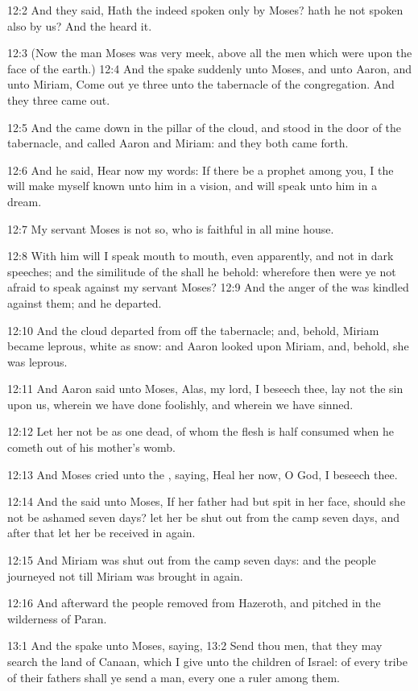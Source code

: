 12:2 And they said, Hath the \LORD indeed spoken only by Moses? hath he not spoken also by us? And the \LORD heard it.

12:3 (Now the man Moses was very meek, above all the men which were upon the face of the earth.)  12:4 And the \LORD spake suddenly unto Moses, and unto Aaron, and unto Miriam, Come out ye three unto the tabernacle of the congregation. And they three came out.

12:5 And the \LORD came down in the pillar of the cloud, and stood in the door of the tabernacle, and called Aaron and Miriam: and they both came forth.

12:6 And he said, Hear now my words: If there be a prophet among you, I the \LORD will make myself known unto him in a vision, and will speak unto him in a dream.

12:7 My servant Moses is not so, who is faithful in all mine house.

12:8 With him will I speak mouth to mouth, even apparently, and not in dark speeches; and the similitude of the \LORD shall he behold: wherefore then were ye not afraid to speak against my servant Moses?  12:9 And the anger of the \LORD was kindled against them; and he departed.

12:10 And the cloud departed from off the tabernacle; and, behold, Miriam became leprous, white as snow: and Aaron looked upon Miriam, and, behold, she was leprous.

12:11 And Aaron said unto Moses, Alas, my lord, I beseech thee, lay not the sin upon us, wherein we have done foolishly, and wherein we have sinned.

12:12 Let her not be as one dead, of whom the flesh is half consumed when he cometh out of his mother's womb.

12:13 And Moses cried unto the \LORD, saying, Heal her now, O God, I beseech thee.

12:14 And the \LORD said unto Moses, If her father had but spit in her face, should she not be ashamed seven days? let her be shut out from the camp seven days, and after that let her be received in again.

12:15 And Miriam was shut out from the camp seven days: and the people journeyed not till Miriam was brought in again.

12:16 And afterward the people removed from Hazeroth, and pitched in the wilderness of Paran.

13:1 And the \LORD spake unto Moses, saying, 13:2 Send thou men, that they may search the land of Canaan, which I give unto the children of Israel: of every tribe of their fathers shall ye send a man, every one a ruler among them.

